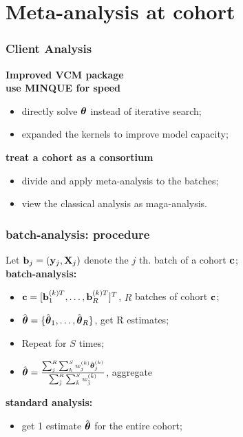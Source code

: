 \documentclass{beamer}
\begin{document}
\section{Meta-analysis at cohort}
\begin{frame}\frametitle{Client Analysis}
  \textbf{Improved VCM package} \\
  \textbf{use MINQUE for speed}
  \begin{itemize}
  \item directly solve $\boldsymbol{\theta}$ instead of iterative search;
  \item expanded the kernels to improve model capacity;
  \end{itemize}
  {\color{green} \textbf{treat a cohort as a consortium}}
  \begin{itemize}
  \item divide and apply meta-analysis to the batches;
  \item view the classical analysis as maga-analysis.
  \end{itemize}
\end{frame}
\begin{frame}\frametitle{batch-analysis: procedure}
  Let $\mathbf{b}_{j}=(\mathbf{y}_{j}, \mathbf{X}_{j})$ denote the $j$ th. batch of a cohort $\mathbf{c}$; \\
  \textbf{batch-analysis:}
  \begin{itemize}
  \item $\mathbf{c} = [\mathbf{b}_1^{(k)T}, \dots, \mathbf{b}_R^{(k)T} ]^T$, $R$ batches of
    cohort $\mathbf{c}$;
  \item $\hat{\boldsymbol{\theta}}=\{\hat{\boldsymbol{\theta}}_1, \dots, \hat{\boldsymbol{\theta}}_R\}$,
    get R estimates;
  \item Repeat for $S$ times;
  \item
    $\hat{\boldsymbol{\theta}} = \frac{\sum_j^R\sum_k^S w_j^{(k)} \hat{\boldsymbol{\theta}}_j^{(k)}}
    {\sum_{\tilde{j}}^R \sum_{\tilde{k}}^S
      w_{\tilde{j}}^{(\tilde{k})}}$, aggregate
  \end{itemize}
  \textbf{standard analysis:}
  \begin{itemize}
  \item get 1 estimate $\hat{\boldsymbol{\theta}}$ for the entire cohort;
  \end{itemize}
\end{frame}
\end{document}
